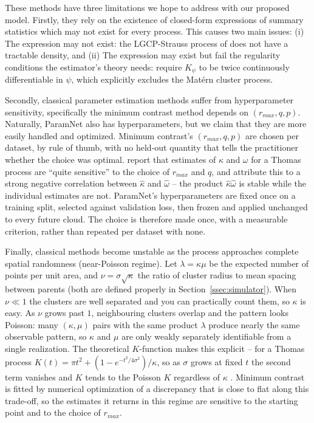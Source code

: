 \documentclass[11pt,a4paper]{article}
\theoremstyle{definitioncolon}
\begin{document}
These methods have three limitations we hope to address with our proposed model. Firstly, they rely on the existence of closed-form expressions of
summary statistics which may not exist for every process.
This causes two main issues: (i) The expression may not exist: the
LGCP-Strauss process of \citet{vihrs2022neural} does not have a tractable density, and (ii) The expression may exist but fail
the regularity conditions the estimator's theory needs:
\citet{waagepetersen2009twostep} require $K_\psi$ to be twice continuously
differentiable in $\psi$, which explicitly excludes the Mat\'ern cluster
process.

Secondly, classical parameter estimation methods suffer from
hyperparameter sensitivity, specifically the minimum contrast method
depends on $(r_{max}, q, p)$. Naturally, ParamNet also has hyperparameters, but we claim that they are more easily handled and optimized. Minimum contrast's $(r_{max},q,p)$ are chosen per dataset, by rule of thumb, with
no held-out quantity that tells the practitioner whether the choice was optimal.
\citet{waagepetersen2009twostep} report that estimates of $\kappa$ and $\omega$
for a Thomas process are ``quite sensitive'' to the choice of $r_{max}$ and $q$,
and attribute this to a strong negative correlation between $\hat\kappa$ and
$\hat\omega$ -- the product $\hat\kappa\hat\omega$ is stable while the
individual estimates are not. ParamNet's hyperparameters are fixed once on a
training split, selected against validation loss, then frozen and applied
unchanged to every future cloud. The choice is therefore made once, with a
measurable criterion, rather than repeated per dataset with none.

Finally, classical methods become unstable as the process approaches complete
spatial randomness (near-Poisson regime). Let $\lambda=\kappa\mu$ be the expected number of points per unit area, and $\nu = \sigma\sqrt{\kappa}$ the ratio of cluster radius to mean spacing between parents (both are defined properly in
Section~\ref{ssec:simulator}). When $\nu \ll 1$ the clusters are well separated
and you can practically count them, so $\kappa$ is easy. As $\nu$ grows past
$1$, neighbouring clusters overlap and the pattern looks Poisson: many
$(\kappa,\mu)$ pairs with the same product $\lambda$ produce nearly the same
observable pattern, so $\kappa$ and $\mu$ are only weakly separately
identifiable from a single realization. The theoretical $K$-function makes this
explicit -- for a Thomas process $K(t) = \pi t^2 + (1-e^{-t^2/4\sigma^2})/\kappa$,
so as $\sigma$ grows at fixed $t$ the second term vanishes and $K$ tends to the
Poisson $K$ regardless of $\kappa$ \citep{waagepetersen2009twostep}.
Minimum contrast is fitted by numerical optimization of
a discrepancy that is close to flat along this trade-off, so the estimates it
returns in this regime are sensitive to the starting point and to the choice of
$r_{max}$.
\end{document}
